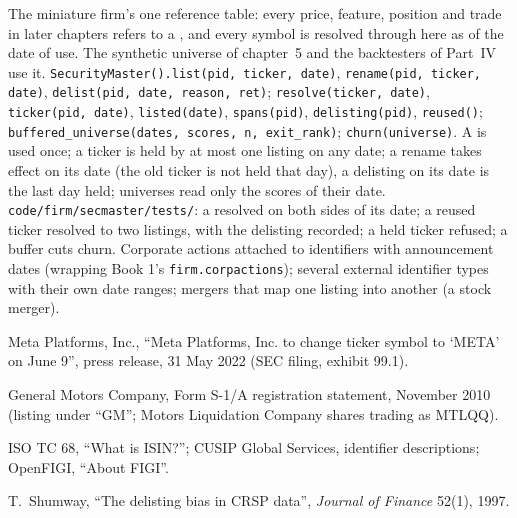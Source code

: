 \begin{build}
 The miniature firm's one reference table: every price, feature, position and trade in later chapters refers to a
, and every symbol is resolved through here as of the date of use. The synthetic universe of chapter~5 and
the backtesters of Part~IV use it.
 \texttt{SecurityMaster().list(pid, ticker, date)}, \texttt{rename(pid, ticker, date)}, \texttt{delist(pid, date,
reason, ret)}; \texttt{resolve(ticker, date)}, \texttt{ticker(pid, date)}, \texttt{listed(date)}, \texttt{spans(pid)},
\texttt{delisting(pid)}, \texttt{reused()}; \texttt{buffered\_universe(dates, scores, n, exit\_rank)}; \texttt{churn(universe)}.
 A  is used once; a ticker is held by at most one listing on any date; a rename takes effect on its
date (the old ticker is not held that day), a delisting on its date is the last day held; universes read only the scores of their
date.
 \texttt{code/firm/secmaster/tests/}: a  resolved on both sides of its date; a reused ticker
resolved to two listings, with the delisting recorded; a held ticker refused; a buffer cuts churn.
 Corporate actions attached to identifiers with announcement dates (wrapping Book 1's \texttt{firm.corpactions});
several external identifier types with their own date ranges; mergers that map one listing into another (a stock merger).
\end{build}

\begin{omsources}
\item Meta Platforms, Inc., ``Meta Platforms, Inc. to change ticker symbol to `META' on June 9'', press release, 31 May 2022 (SEC
filing, exhibit 99.1).
\item General Motors Company, Form S-1/A registration statement, November 2010 (listing under ``GM''; Motors Liquidation Company
shares trading as MTLQQ).
\item ISO TC 68, ``What is ISIN?''; CUSIP Global Services, identifier descriptions; OpenFIGI, ``About FIGI''.
\item T.~Shumway, ``The delisting bias in CRSP data'', \emph{Journal of Finance} 52(1), 1997.
\end{omsources}

